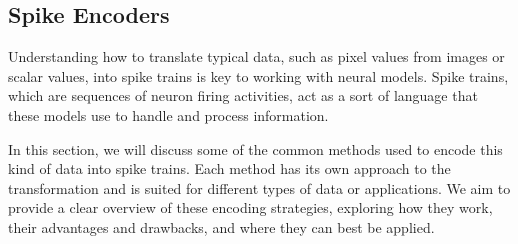 \subsection{Spike Encoders}


Understanding how to translate typical data, such as pixel values from images or scalar values, into spike trains is key to working with neural models. Spike trains, which are sequences of neuron firing activities, act as a sort of language that these models use to handle and process information. 

In this section, we will discuss some of the common methods used to encode this kind of data into spike trains. Each method has its own approach to the transformation and is suited for different types of data or applications. We aim to provide a clear overview of these encoding strategies, exploring how they work, their advantages and drawbacks, and where they can best be applied.







